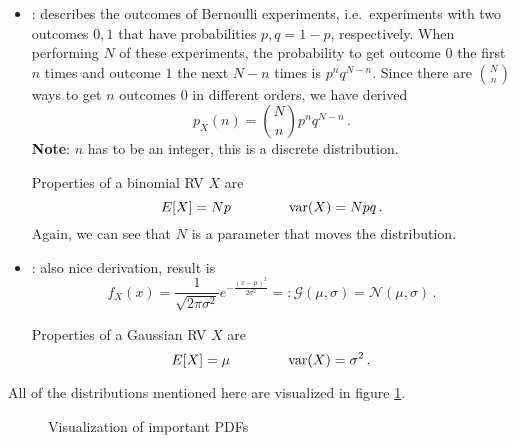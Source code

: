 \begin{ex}
\begin{itemize}
\item {}: describes the outcomes of Bernoulli experiments, i.e.~experiments with two outcomes $0, 1$ that have probabilities $p, q = 1 - p$, respectively. When performing $N$ of these experiments, the probability to get outcome $0$ the first $n$ times and outcome $1$ the next $N - n$ times is $p^n q^{N - n}$. Since there are $\binom{N}{n}$ ways to get $n$ outcomes $0$ in different orders, we have derived
\begin{equation}
p_X(n) = \binom{N}{n} p^n q^{N - n} \, .
\end{equation}
\textbf{Note}: $n$ has to be an integer, this is a discrete distribution.

Properties of a binomial RV $X$ are
\begin{equation}
E[X] = N p \qquad \qquad \operatorname{var}(X) = N p q \, .
\end{equation}
Again, we can see that $N$ is a parameter that moves the distribution.


\item {}: also nice derivation, result is
\begin{equation}
f_X(x) = \frac{1}{\sqrt{2 \pi \sigma^2}} e^{- \frac{(x - \mu)^2}{2 \sigma^2}} =: \mathcal{G}(\mu, \sigma) = \mathcal{N}(\mu, \sigma) \, .
\end{equation}

Properties of a Gaussian RV $X$ are
\begin{equation}
E[X] = \mu \qquad \qquad \operatorname{var}(X) = \sigma^2 \, .
\end{equation}
\end{itemize}

All of the distributions mentioned here are visualized in figure \ref{fig:pdf_plots}.
\end{ex}



\begin{figure}
\centering

%
\hspace{0.04\textwidth}%
%


%
\hspace{0.04\textwidth}%
%




\caption{Visualization of important PDFs}
\label{fig:pdf_plots}
\end{figure}



